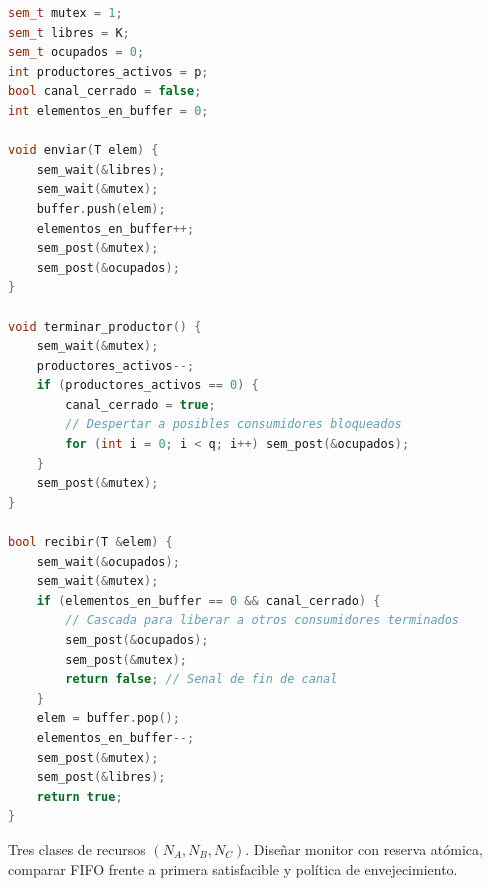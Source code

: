 \begin{solucion}
\begin{lstlisting}[language=C++]
sem_t mutex = 1;
sem_t libres = K;
sem_t ocupados = 0;
int productores_activos = p;
bool canal_cerrado = false;
int elementos_en_buffer = 0;

void enviar(T elem) {
    sem_wait(&libres);
    sem_wait(&mutex);
    buffer.push(elem);
    elementos_en_buffer++;
    sem_post(&mutex);
    sem_post(&ocupados);
}

void terminar_productor() {
    sem_wait(&mutex);
    productores_activos--;
    if (productores_activos == 0) {
        canal_cerrado = true;
        // Despertar a posibles consumidores bloqueados
        for (int i = 0; i < q; i++) sem_post(&ocupados);
    }
    sem_post(&mutex);
}

bool recibir(T &elem) {
    sem_wait(&ocupados);
    sem_wait(&mutex);
    if (elementos_en_buffer == 0 && canal_cerrado) {
        // Cascada para liberar a otros consumidores terminados
        sem_post(&ocupados);
        sem_post(&mutex);
        return false; // Senal de fin de canal
    }
    elem = buffer.pop();
    elementos_en_buffer--;
    sem_post(&mutex);
    sem_post(&libres);
    return true;
}
\end{lstlisting}
\end{solucion}

\begin{ejercicio}
Tres clases de recursos $(N_A, N_B, N_C)$. Diseñar monitor con reserva atómica, comparar FIFO frente a primera satisfacible y política de envejecimiento.
\end{ejercicio}

